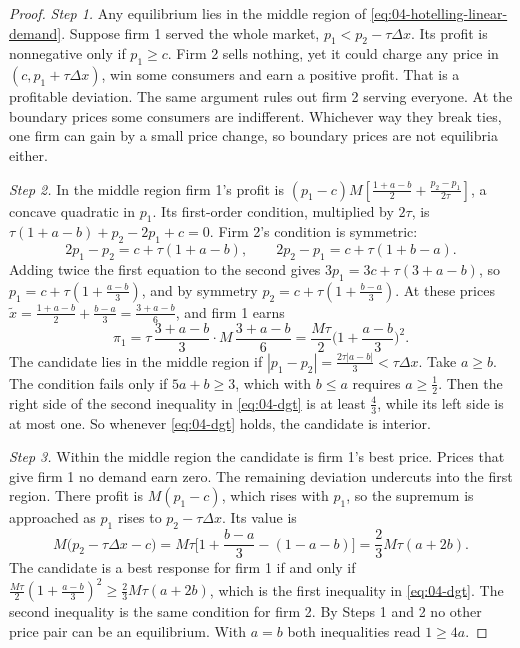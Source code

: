 \begin{proof}
\emph{Step 1.} Any equilibrium lies in the middle region of \eqref{eq:04-hotelling-linear-demand}. Suppose firm 1
served the whole market, $p_1 < p_2 - \tau\Delta x$. Its profit is nonnegative only if $p_1 \ge c$. Firm 2 sells
nothing, yet it could charge any price in $(c, p_1 + \tau\Delta x)$, win some consumers and earn a positive profit.
That is a profitable deviation. The same argument rules out firm 2 serving everyone. At the boundary prices some
consumers are indifferent. Whichever way they break ties, one firm can gain by a small price change, so boundary
prices are not equilibria either.

\emph{Step 2.} In the middle region firm 1's profit is
$(p_1 - c)M[\frac{1 + a - b}{2} + \frac{p_2 - p_1}{2\tau}]$, a concave quadratic in $p_1$. Its first-order condition,
multiplied by $2\tau$, is $\tau(1 + a - b) + p_2 - 2p_1 + c = 0$. Firm 2's condition is symmetric:
\begin{equation*}
2p_1 - p_2 = c + \tau(1 + a - b), \qquad 2p_2 - p_1 = c + \tau(1 + b - a).
\end{equation*}
Adding twice the first equation to the second gives $3p_1 = 3c + \tau(3 + a - b)$, so
$p_1 = c + \tau(1 + \frac{a - b}{3})$, and by symmetry $p_2 = c + \tau(1 + \frac{b - a}{3})$. At these prices
$\tilde x = \frac{1 + a - b}{2} + \frac{b - a}{3} = \frac{3 + a - b}{6}$, and firm 1 earns
\begin{equation*}
\pi_1 = \tau\,\frac{3 + a - b}{3}\cdot M\,\frac{3 + a - b}{6} = \frac{M\tau}{2}\Big(1 + \frac{a - b}{3}\Big)^2 .
\end{equation*}
The candidate lies in the middle region if $|p_1 - p_2| = \frac{2\tau|a - b|}{3} < \tau\Delta x$. Take $a \ge b$. The
condition fails only if $5a + b \ge 3$, which with $b \le a$ requires $a \ge \frac{1}{2}$. Then the right side of
the second inequality in \eqref{eq:04-dgt} is at least $\frac{4}{3}$, while its left side is at most one. So
whenever \eqref{eq:04-dgt} holds, the candidate is interior.

\emph{Step 3.} Within the middle region the candidate is firm 1's best price. Prices that give firm 1 no
demand earn zero. The remaining deviation undercuts into the first region. There profit is $M(p_1 - c)$, which rises
with $p_1$, so the supremum is approached as $p_1$ rises to $p_2 - \tau\Delta x$. Its value is
\begin{equation*}
M\big(p_2 - \tau\Delta x - c\big) = M\tau\Big[1 + \frac{b - a}{3} - (1 - a - b)\Big] = \frac{2}{3}M\tau(a + 2b).
\end{equation*}
The candidate is a best response for firm 1 if and only if
$\frac{M\tau}{2}(1 + \frac{a - b}{3})^2 \ge \frac{2}{3}M\tau(a + 2b)$, which is the first inequality in
\eqref{eq:04-dgt}. The second inequality is the same condition for firm 2. By Steps 1 and 2 no other price pair
can be an equilibrium. With $a = b$ both inequalities read $1 \ge 4a$.
\end{proof}

